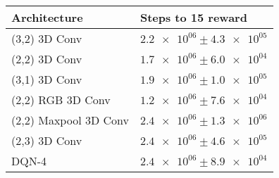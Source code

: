 \begin{tabular}{ll}
\hline
 Architecture          & Steps to 15 reward                \\
\hline
 (3,2) 3D Conv         & $\num{2.2e+06} \pm \num{4.3e+05}$ \\
 (2,2) 3D Conv         & $\num{1.7e+06} \pm \num{6.0e+04}$ \\
 (3,1) 3D Conv         & $\num{1.9e+06} \pm \num{1.0e+05}$ \\
 (2,2) RGB 3D Conv     & $\num{1.2e+06} \pm \num{7.6e+04}$ \\
 (2,2) Maxpool 3D Conv & $\num{2.4e+06} \pm \num{1.3e+06}$ \\
 (2,3) 3D Conv         & $\num{2.4e+06} \pm \num{4.6e+05}$ \\
 DQN-4                 & $\num{2.4e+06} \pm \num{8.9e+04}$ \\
\hline
\end{tabular}